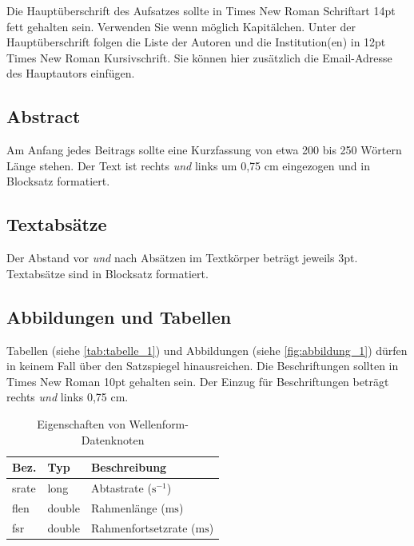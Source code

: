 \documentclass[12pt,a4paper]{article}
\begin{document}
Die Hauptüberschrift des Aufsatzes sollte in Times New Roman Schriftart 14pt fett gehalten sein. 
Verwenden Sie wenn möglich Kapitälchen. Unter der Hauptüberschrift folgen die Liste der Autoren 
und die Institution(en) in 12pt Times New Roman Kursivschrift. Sie können hier zusätzlich die 
Email-Adresse des Hauptautors einfügen. 

\subsection{Abstract}

Am Anfang jedes Beitrags sollte eine Kurzfassung von etwa 200 bis 250 Wörtern Länge stehen. 
Der Text ist rechts \emph{und} links um 0,75 cm eingezogen und in Blocksatz formatiert. 

\subsection{Textabsätze}

Der Abstand vor \emph{und} nach Absätzen im Textkörper beträgt jeweils 3pt. 
Textabsätze sind in Blocksatz formatiert.

\subsection{Abbildungen und Tabellen}

Tabellen (siehe \autoref{tab:tabelle_1}) und Abbildungen (siehe \autoref{fig:abbildung_1})
dürfen in keinem Fall über den Satzspiegel hinausreichen. 
Die Beschriftungen sollten in Times New Roman 10pt gehalten sein. Der Einzug für Beschriftungen 
beträgt rechts \emph{und} links 0,75 cm. 

\begin{table}[hbt]
  \caption{Eigenschaften von Wellenform-Datenknoten}
  \begin{tabular}{|l|l|l|}
    \hline
    \textbf{Bez.} & \textbf{Typ} & \textbf{Beschreibung}\\
    \hline
    srate & long & Abtastrate ($\mathrm{s}^{-1}$)\\
    \hline
    flen & double & Rahmenlänge ($\mathrm{ms}$)\\
    \hline
    fsr & double & Rahmenfortsetzrate ($\mathrm{ms}$)\\
    \hline
  \end{tabular}
  \label{tab:tabelle_1}
\end{table}
\end{document}
